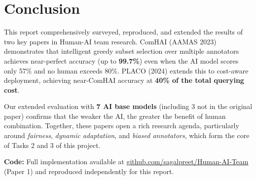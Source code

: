 \documentclass[10pt,twocolumn]{article}
\begin{document}
\section{Conclusion}

This report comprehensively surveyed, reproduced, and extended the
results of two key papers in Human-AI team research. ComHAI (AAMAS 2023)
demonstrates that intelligent greedy subset selection over multiple
annotators achieves near-perfect accuracy (up to \textbf{99.7\%}) even
when the AI model scores only 57\% and no human exceeds 80\%.
PLACO (2024) extends this to cost-aware deployment, achieving
near-ComHAI accuracy at \textbf{40\% of the total querying cost}.

Our extended evaluation with \textbf{7 AI base models} (including 3 not
in the original paper) confirms that the weaker the AI, the greater the
benefit of human combination. Together, these papers open a rich
research agenda, particularly around \emph{fairness}, \emph{dynamic
adaptation}, and \emph{biased annotators}, which form the core of
Tasks 2 and 3 of this project.

\vspace{4pt}
\noindent\small
\textbf{Code:} Full implementation available at
\url{github.com/sagalpreet/Human-AI-Team} (Paper 1) and
reproduced independently for this report.
\end{document}
